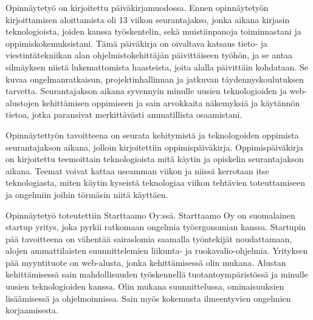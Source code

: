 \documentclass[11pt,a4paper,titlepage,oneside]{article}
\begin{document}
Opinnäytetyö on kirjoitettu päiväkirjamuodossa. 
Ennen opinnäytetyön kirjoittamisen aloittamista oli 13 viikon seurantajakso, jonka aikana kirjasin teknologioista,
joiden kanssa työskentelin, sekä muistiinpanoja toiminnastani ja oppimiskokemuksistani.
Tämä päiväkirja on oivaltava katsaus tieto- ja viestintätekniikan alan ohjelmistokehittäjän päivittäiseen työhön,
ja se antaa silmäyksen niistä lukemattomista haasteista, joita alalla päivittäin kohdataan.
Se kuvaa ongelmanratkaisun, projektinhallinnan ja jatkuvan täydennyskoulutuksen tarvetta.
Seurantajakson aikana syvennyin minulle uusien teknologioiden ja web-alustojen kehittämisen oppimiseen ja sain arvokkaita näkemyksiä ja käytännön tietoa,
jotka paransivat merkittävästi ammatillista osaamistani.
\medskip



Opinnäytettyön tavoitteena on seurata kehitymistä ja teknologoiden oppimista seurantajakson aikana,
jolloin kirjoitettiin oppimispäiväkirja.
Oppimispäiväkirja on kirjoitettu teemoittain teknologioista mitä käytin ja opiskelin seurantajakson aikana.
Teemat voivat kattaa useamman viikon ja niissä kerrotaan itse teknologiasta, miten käytin kyseistä teknologiaa viikon tehtävien toteuttamiseen ja
ongelmiin joihin törmäsin niitä käyttäen.
\medskip





Opinnäytetyö toteutettiin Starttaamo Oy:ssä. Starttaamo Oy on suomalainen startup yritys, joka pyrkii ratkomaan ongelmia työergonomian kanssa.
Startupin pää tavoitteena on vähentää sairaslomia saamalla työntekijät noudattamaan, alojen ammattilaisten suunnittelemien liikunta- ja ruokavalio-ohjelmia. 
Yrityksen pää myyntituote on web-alusta, jonka kehittämisessä olin mukana. 
%
Alustan kehittämisessä sain mahdollisuuden työskennellä tuotantoympäristössä ja minulle uusien teknologioiden kanssa.
Olin mukana suunnittelussa, ominaisuuksien lisäämisessä ja ohjelmoinnissa. 
Sain myös kokemusta ilmeentyvien ongelmien korjaamisesta.

\medskip
\end{document}
